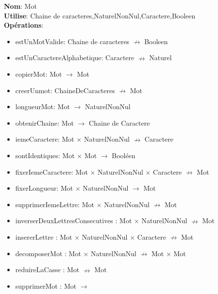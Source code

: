 \documentclass{article}
\begin{document}
    \noindent
    \textbf{Nom}: Mot \\
    \textbf{Utilise}: Chaine de caracteres,NaturelNonNul,Caractere,Booleen \\
    \textbf{Opérations}: \begin{itemize}[label=$\ $, leftmargin=2cm, itemsep=0cm]
        \item estUnMotValide: Chaine de caracteres $\nrightarrow $ Booleen
        \item estUnCaractereAlphabetique: Caractere $\nrightarrow $ Naturel
        \item copierMot: Mot $\rightarrow $ Mot
        \item creerUnmot: ChaineDeCaracteres $ \nrightarrow$ Mot
        \item longueurMot: Mot $ \rightarrow$  NaturelNonNul
        \item obtenirChaine: Mot $\rightarrow $ Chaine de Caractere
        \item iemeCaractere: Mot $ \times $ NaturelNonNul $ \nrightarrow$  Caractere
        \item sontIdentiques: Mot $ \times $ Mot $ \rightarrow$  Booléen
    	\item fixerIemeCaractere: Mot $ \times $ NaturelNonNul $ \times $ Caractere $\nrightarrow$ Mot
    	\item fixerLongueur: Mot $ \times $ NaturelNonNul $\rightarrow$ Mot
    	\item supprimerIemeLettre: Mot $ \times $ NaturelNonNul $\nrightarrow$ Mot
    	\item inverserDeuxLettresConsecutives : Mot $\times$ NaturelNonNul $\nrightarrow$ Mot
        \item insererLettre : Mot $\times$ NaturelNonNul $ \times $ Caractere $\nrightarrow$ Mot
        \item decomposerMot : Mot $\times$ NaturelNonNul $\nrightarrow$ Mot $\times$ Mot
        \item reduireLaCasse : Mot $\nrightarrow$ Mot
        \item supprimerMot : Mot $\rightarrow $
    \end{itemize}
    
\end{document}
